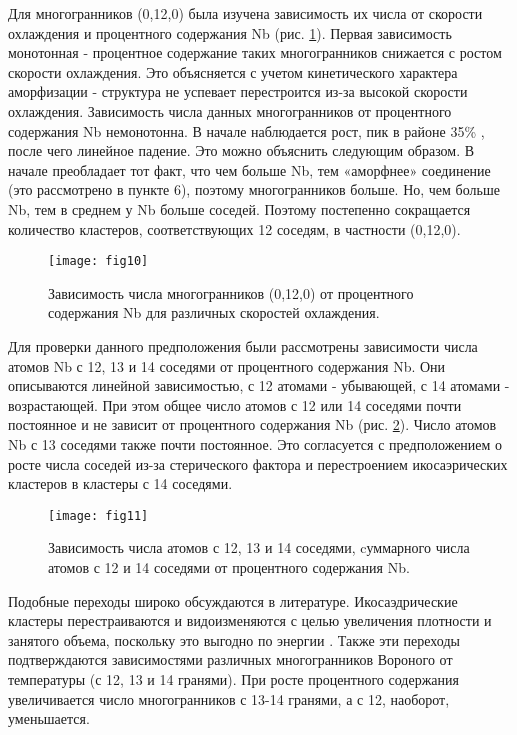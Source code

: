 Для многогранников (0,12,0) была изучена зависимость их числа  от скорости охлаждения  и процентного содержания Nb (рис. \ref{Vp-p}). Первая зависимость  монотонная - процентное содержание таких многогранников снижается с ростом скорости охлаждения. Это объясняется с учетом кинетического характера аморфизации - структура не успевает перестроится из-за высокой скорости охлаждения. Зависимость числа данных многогранников от процентного содержания Nb немонотонна. В начале наблюдается рост, пик в районе 35\% , после чего линейное падение. Это можно объяснить следующим образом. В начале преобладает тот факт, что чем больше Nb, тем «аморфнее» соединение (это рассмотрено в пункте 6), поэтому многогранников больше. Но, чем больше Nb, тем в среднем у Nb больше соседей. Поэтому постепенно сокращается количество кластеров, соответствующих 12 соседям, в частности (0,12,0). 
\begin{figure}[h!]
	\begin{center}
		\texttt{[image: fig10]}{}{}{}
		\caption{Зависимость числа многогранников (0,12,0) от процентного содержания Nb для различных скоростей охлаждения.}
		\label{Vp-p}
	\end{center}
\end{figure}

Для проверки данного предположения были  рассмотрены зависимости числа атомов Nb с 12, 13 и  14 соседями от процентного содержания Nb. Они описываются линейной зависимостью, с 12 атомами - убывающей, с 14 атомами - возрастающей. При этом общее число атомов с 12 или 14 соседями почти постоянное и не зависит от процентного содержания Nb (рис. \ref{sosedi_pr}). Число атомов Nb с 13 соседями также почти постоянное. Это согласуется с предположением о росте числа соседей из-за стерического фактора и перестроением икосаэрических кластеров в кластеры с 14 соседями.
\begin{figure}[h!]
	\begin{center}
		\texttt{[image: fig11]}{}{}{}
		\caption{Зависимость числа атомов с 12, 13 и  14 соседями, cуммарного числа атомов с 12 и 14 соседями от процентного содержания Nb.}
		\label{sosedi_pr}
	\end{center}
\end{figure}

Подобные переходы широко обсуждаются в литературе. Икосаэдрические кластеры перестраиваются и видоизменяются с целью увеличения плотности и занятого объема, поскольку это выгодно по энергии \cite{Sheng}.  Также эти переходы  подтверждаются  зависимостями различных многогранников Вороного от температуры (с 12, 13 и 14 гранями). При росте процентного содержания увеличивается число многогранников с 13-14 гранями, а с 12, наоборот, уменьшается. 


